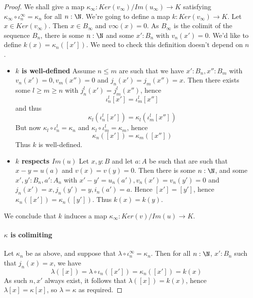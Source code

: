 \begin{proof}
      We shall give a map $\kappa_\infty:Ker(v_\infty)/Im(u_\infty) \to K$ satisfying 
      $\kappa_\infty \circ \iota_n^\infty= \kappa_n$ for all $n:\N$.
      We're going to define a map $k:Ker(v_\infty) \to K$.
      Let $x\in Ker(v_\infty)$. Then $x\in B_\infty$ and $v\infty(x) = 0$. 
      As $B_\infty$ is the colimit of the sequence $B_n$, 
      there is some $n:\N$ and some $x':B_n$ with $v_n(x') = 0$. 
      We'd like to define $k(x) = \kappa_n([x'])$. We need to check this definition doesn't depend on $n$. 
      \begin{itemize}
        \item \textbf{$k$ is well-defined} 
      Assume $n\leq m$ are such that we have $x':B_n, x'':B_m$ with $v_n(x') = 0, v_m(x'') = 0$ 
      and $j_n(x') = j_m(x'') = x$. 
      Then there exists some $l\geq m\geq n$ with 
      $j_n^l (x') = j_m^l(x'')$, hence 
      $$\iota_n^l[x'] = \iota_m^l[x'']$$ and thus 
      $$\kappa_l(\iota_n^l[x']) = \kappa_l(\iota_m^l[x''])$$
      But now $\kappa_l\circ \iota_n^l = \kappa_n$ and $\kappa_l\circ \iota_m^l = \kappa_m$, hence 
      $$\kappa_n([x']) = \kappa_m([x''])$$
      Thus $k$ is well-defined. 
      \item \textbf{$k$ respects $Im(u)$}
        Let $x,y:B$ and let $a:A$ be such that are such that $x-y = u(a)$ and $v(x) = v(y) = 0$.
        Then there is some $n:\N$, and some $x',y':B_n, a':A_n$ with $x'-y'= u_n(a'), v_n(x') = v_n(y') = 0$ 
        and $j_n(x') = x, j_n(y') = y, i_n(a') = a$. 
        Hence $[x'] = [y']$, hence $\kappa_n([x']) = \kappa_n([y'])$.
        Thus $k(x) = k(y)$. 
      \end{itemize}
      We conclude that $k$ induces a map $\kappa_\infty:Ker(v)/Im(u) \to K$. 
    \paragraph{$\kappa$ is colimiting}
    Let $\kappa_n$ be as above, and suppose that 
    $\lambda \circ \iota_n^\infty = \kappa_n$. 
    Then for all $n:\N$, $x':B_n$ such that $j_n(x) = x$, we have 
    $$\lambda ([x]) = \lambda \circ \iota_n([x']) = \kappa_n([x']) = k(x)$$
    As such $n,x'$ always exist, it follows that 
    $\lambda([x]) = k(x)$, hence $\lambda[x] = \kappa[x]$, so $\lambda = \kappa$ as required. 
\end{proof} 


